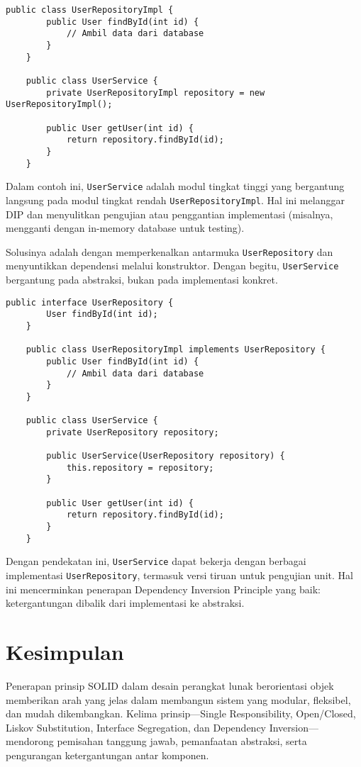 \begin{lstlisting}[style=JavaStyle, caption={Contoh pelanggaran DIP}]
	public class UserRepositoryImpl {
		public User findById(int id) {
			// Ambil data dari database
		}
	}
	
	public class UserService {
		private UserRepositoryImpl repository = new UserRepositoryImpl();
		
		public User getUser(int id) {
			return repository.findById(id);
		}
	}
\end{lstlisting}

Dalam contoh ini, \texttt{UserService} adalah modul tingkat tinggi yang bergantung langsung pada modul tingkat rendah \texttt{UserRepositoryImpl}. Hal ini melanggar DIP dan menyulitkan pengujian atau penggantian implementasi (misalnya, mengganti dengan in-memory database untuk testing).

Solusinya adalah dengan memperkenalkan antarmuka \texttt{UserRepository} dan menyuntikkan dependensi melalui konstruktor. Dengan begitu, \texttt{UserService} bergantung pada abstraksi, bukan pada implementasi konkret.

\begin{lstlisting}[style=JavaStyle, caption={Refaktor menggunakan DIP}]
	public interface UserRepository {
		User findById(int id);
	}
	
	public class UserRepositoryImpl implements UserRepository {
		public User findById(int id) {
			// Ambil data dari database
		}
	}
	
	public class UserService {
		private UserRepository repository;
		
		public UserService(UserRepository repository) {
			this.repository = repository;
		}
		
		public User getUser(int id) {
			return repository.findById(id);
		}
	}
\end{lstlisting}

Dengan pendekatan ini, \texttt{UserService} dapat bekerja dengan berbagai implementasi \texttt{UserRepository}, termasuk versi tiruan untuk pengujian unit. Hal ini mencerminkan penerapan Dependency Inversion Principle yang baik: ketergantungan dibalik dari implementasi ke abstraksi.



\section{Kesimpulan}

Penerapan prinsip SOLID dalam desain perangkat lunak berorientasi objek memberikan arah yang jelas dalam membangun sistem yang modular, fleksibel, dan mudah dikembangkan. Kelima prinsip—Single Responsibility, Open/Closed, Liskov Substitution, Interface Segregation, dan Dependency Inversion—mendorong pemisahan tanggung jawab, pemanfaatan abstraksi, serta pengurangan ketergantungan antar komponen.


